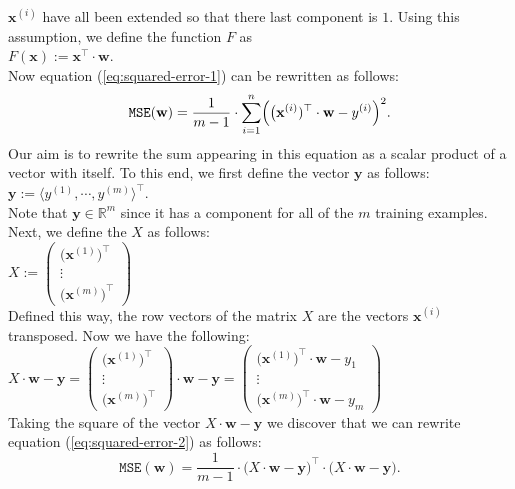 $\mathbf{x}^{(i)}$ have all been extended so that there last component is $1$.  Using this
assumption,  we define the
function $F$ as
\\[0.2cm]
\hspace*{1.3cm}
$F(\mathbf{x}) := \mathbf{x}^\top \cdot \mathbf{w}$.
\\[0.2cm]
Now equation (\ref{eq:squared-error-1}) can be rewritten as follows:
\begin{equation}
  \label{eq:squared-error-2}
  \mathtt{MSE}(\mathbf{w}) = \frac{1}{m-1} \cdot \sum\limits_{i=1}^n \Bigl(\bigl(\mathbf{x}^{(i)})^\top \cdot \mathbf{w}  - y^{(i)}\Bigr)^2.
\end{equation}
Our aim is to rewrite the sum appearing in this equation as a scalar product of a vector with
itself.  To this end, we first define the vector $\mathbf{y}$ as follows:
\\[0.2cm]
\hspace*{1.3cm}
$\mathbf{y} := \langle y^{(1)}, \cdots, y^{(m)} \rangle^\top$.
\\[0.2cm]
Note that $\mathbf{y} \in \mathbb{R}^m$ since it has a component for all of the $m$ training
examples.  Next, we define the  $X$ as follows:
\\[0.2cm]
\hspace*{1.3cm}
$X := \left(
  \begin{array}{c}
    \bigl(\mathbf{x}^{(1)}\bigr)^\top  \\
    \vdots                         \\
    \bigl(\mathbf{x}^{(m)}\bigr)^\top
  \end{array}
  \right)   
$
\\[0.2cm]
Defined this way, the row vectors of the matrix $X$ are the vectors $\mathbf{x}^{(i)}$ transposed.
Now we have the following:
\\[0.2cm]
\hspace*{1.3cm}
$X \cdot \mathbf{w} - \mathbf{y} = \left(
  \begin{array}{c}
    \bigl(\mathbf{x}^{(1)}\bigr)^\top  \\
    \vdots                         \\
    \bigl(\mathbf{x}^{(m)}\bigr)^\top
  \end{array}
  \right) \cdot \mathbf{w} - \mathbf{y} = \left(
  \begin{array}{c}
    \bigl(\mathbf{x}^{(1)}\bigr)^\top \cdot \mathbf{w} - y_1 \\
    \vdots                         \\
    \bigl(\mathbf{x}^{(m)}\bigr)^\top \cdot \mathbf{w} - y_m
  \end{array}
  \right)
$
\\[0.2cm]
Taking the square of the vector $X \cdot \mathbf{w} - \mathbf{y}$ we discover that
we can rewrite equation (\ref{eq:squared-error-2}) as follows:
\begin{equation}
  \label{eq:squared-error-3}
  \mathtt{MSE}(\mathbf{w}) = \frac{1}{m-1} \cdot \bigl(X \cdot \mathbf{w} - \textbf{y}\bigr)^\top \cdot 
                                            \bigl(X \cdot \mathbf{w} - \textbf{y}\bigr).
\end{equation}

